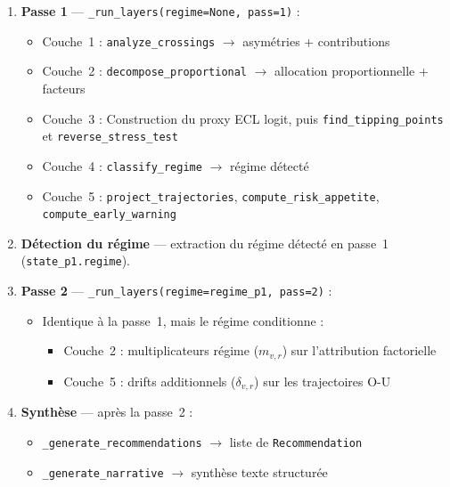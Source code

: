 \documentclass[12pt,a4paper]{article}
\begin{document}
\begin{enumerate}[label=\textbf{\arabic*.}]
    \item \textbf{Passe 1} --- \texttt{\_run\_layers(regime=None, pass=1)} :
    \begin{itemize}[nosep]
        \item Couche~1 : \texttt{analyze\_crossings} $\to$ asym\'etries + contributions
        \item Couche~2 : \texttt{decompose\_proportional} $\to$ allocation proportionnelle + facteurs
        \item Couche~3 : Construction du proxy ECL logit, puis \texttt{find\_tipping\_points}
              et \texttt{reverse\_stress\_test}
        \item Couche~4 : \texttt{classify\_regime} $\to$ r\'egime d\'etect\'e
        \item Couche~5 : \texttt{project\_trajectories}, \texttt{compute\_risk\_appetite},
              \texttt{compute\_early\_warning}
    \end{itemize}

    \item \textbf{D\'etection du r\'egime} --- extraction du r\'egime d\'etect\'e en passe~1
          (\texttt{state\_p1.regime}).

    \item \textbf{Passe 2} --- \texttt{\_run\_layers(regime=regime\_p1, pass=2)} :
    \begin{itemize}[nosep]
        \item Identique \`a la passe~1, mais le r\'egime conditionne :
        \begin{itemize}[nosep]
            \item Couche~2 : multiplicateurs r\'egime ($m_{v,r}$) sur l'attribution factorielle
            \item Couche~5 : drifts additionnels ($\delta_{v,r}$) sur les trajectoires O-U
        \end{itemize}
    \end{itemize}

    \item \textbf{Synth\`ese} --- apr\`es la passe~2 :
    \begin{itemize}[nosep]
        \item \texttt{\_generate\_recommendations} $\to$ liste de \texttt{Recommendation}
        \item \texttt{\_generate\_narrative} $\to$ synth\`ese texte structur\'ee
    \end{itemize}
\end{enumerate}
\end{document}

